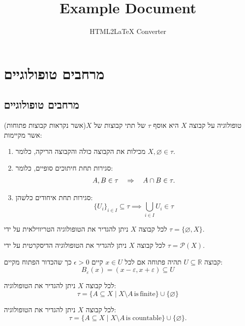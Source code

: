 \documentclass{tstextbook}
\begin{document}
\title{Example Document}
\author{HTML2LaTeX Converter}
\maketitle

\section{מרחבים טופולוגיים}

\subsection{מרחבים טופולוגיים}

\begin{definition}[טופולוגיה]
טופולוגיה על קבוצה \(X\) היא אוסף \(\tau\) של תתי קבוצות של \(X\)(אשר נקראות קבוצות פתוחות) אשר מקיימות:

  \begin{enumerate}
    \item מכילות את הקבוצה כולה והקבוצה הריקה, כלומר \(X,\varnothing  \in \tau\). 


    \item סגירות תחת חיתוכים סופיים, כלומר: 
$$\begin{array}{r l}{A,B\in\tau}&{{}\Rightarrow\quad A\cap B\in\tau.}\end{array}$$


    \item סגירות תחת איחודים כלשהן: 
$$\{U_{i}\}_{i\in I}\subseteq\tau\implies\bigcup_{i\in I}U_{i}\in\tau$$


  \end{enumerate}
\end{definition}
\begin{example}
לכל קבוצה \(X\) ניתן להגדיר את הטופולוגיה הטריווילאית על ידי \(\tau=\{ \varnothing,X \}\).

\end{example}
\begin{example}
לכל קבוצה \(X\) ניתן להגדיר את הטופולוגיה הדיסקרטית על ידי \(\tau=\mathcal{P}(X)\).

\end{example}
\begin{example}
קבוצה \(U\subseteq \mathbb{R}\) תהיה פתוחה אם לכל \(x \in U\) קיים \(\epsilon>0\) כך שהכדור הפתוח מקיים:
$$B_{\varepsilon}(x)=(x-\varepsilon,x+\varepsilon)\subseteq U$$

\end{example}
\begin{example}
לכל קבוצה \(X\) ניתן להגדיר את הטופולוגיה:
$$\tau=\{A\subseteq X\mid X\setminus A\,\mathrm{is\,finite}\}\cup\{\varnothing \}$$

\end{example}
\begin{example}
לכל קבוצה \(X\) ניתן להגדיר את הטופולוגיה:
$$\tau=\{A\subseteq X\mid X\setminus A\,\mathrm{is\;countable}\}\cup\{\varnothing \}.$$

\end{example}
\end{document}

